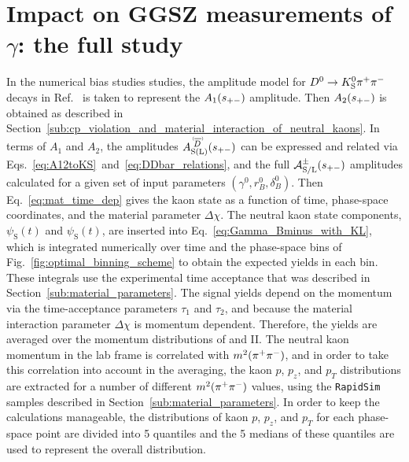 
\section{\texorpdfstring{Impact on GGSZ measurements of $\gamma$: the full study}{Impact on GGSZ measurements of gamma: the full study}} %
\label{sec:impact_on_ggsz_measurements}


In the numerical bias studies studies, the amplitude model for ${{D}^0}\rightarrow{\ensuremath{{K}^0_{\mathrm{S}}}}{\ensuremath{{\pi}^+}}{\ensuremath{{\pi}^-}}$ decays in Ref.~\cite{DalitzModel18} is taken to represent the $A_1(s_{+-})$ amplitude. Then $A_2(s_{+-})$ is obtained as described in Section~\ref{sub:cp_violation_and_material_interaction_of_neutral_kaons}. In terms of $A_1$ and $A_2$, the amplitudes $\ADorDbSL(\spm)$ can be expressed and related via Eqs.~\eqref{eq:A12toKS}~and~\eqref{eq:DDbar_relations}, and the full $\mathcal{A}^\pm_\text{S/L}(s_{+-})$ amplitudes calculated for a given set of input parameters $(\gamma^0, r_B^0, \delta_B^0)$.
Then Eq.~\eqref{eq:mat_time_dep} gives the kaon state as a function of time, phase-space coordinates, and the material parameter $\Delta\chi$. The neutral kaon state components, $\psi_\text{S}(t)$ and $\psi_\text{S}(t)$, are inserted into Eq.~\eqref{eq:Gamma_Bminus_with_KL}, which is integrated numerically over time and the phase-space bins of Fig.~\ref{fig:optimal_binning_scheme} to obtain the expected yields in each bin. These integrals use the experimental time acceptance that was described in Section~\ref{sub:material_parameters}. 
The signal yields depend on the momentum via the time-acceptance parameters $\tau_1$ and $\tau_2$, and because the material interaction parameter $\Delta\chi$ is momentum dependent. Therefore, the yields are averaged over the \KS momentum distributions of \lhcb and \belle II. The neutral kaon momentum in the lab frame is correlated with $m^2({{\pi}^+}{{\pi}^-})$, and in order to take this correlation into account in the averaging, the kaon $p$, $p_z$, and $p_T$ distributions are extracted for a number of different $m^2({{\pi}^+}{{\pi}^-})$ values, using the \texttt{RapidSim} samples described in Section~\ref{sub:material_parameters}.  
In order to keep the calculations manageable, the distributions of kaon $p$, $p_z$, and $p_T$ for each phase-space point are divided into 5 quantiles and the 5 medians of these quantiles are used to represent the overall distribution.


